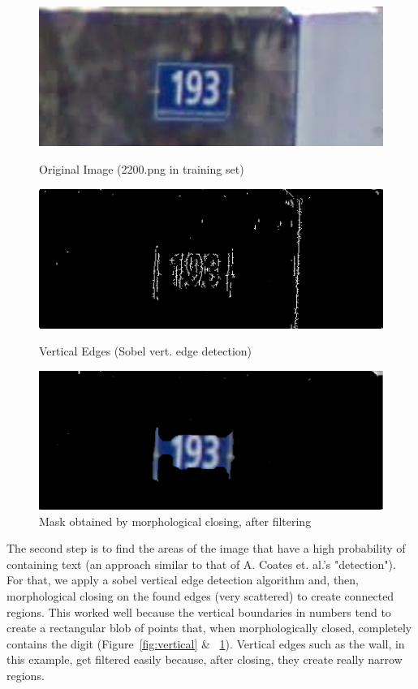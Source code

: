 \documentclass{article} %
\begin{document}
\begin{figure}[!htb]
  \includegraphics[width=\linewidth]{images/image02}
  \caption{Original Image (2200.png in training set)}
  \label{fig:orig}
\endminipage\hfill
{}
  \includegraphics[width=\linewidth]{images/image06}
  \caption{Vertical Edges (Sobel vert. edge detection)}
  \label{fig:vertical}
\endminipage\hfill
{}%
  \includegraphics[width=\linewidth]{images/image00}
  \caption{Mask obtained by morphological closing, after filtering}
  \label{fig:mask}
\endminipage
\end{figure}

The second step is to find the areas of the image that have a high probability of containing text (an approach similar to that of A. Coates et. al.'s "detection"\cite{coates2011text}). For that, we apply a sobel vertical edge detection algorithm and, then, morphological closing on the found edges (very scattered) to create connected regions. This worked well because the vertical boundaries in numbers tend to create a rectangular blob of points that, when morphologically closed, completely contains the digit (Figure~\ref{fig:vertical} \& ~\ref{fig:mask}). Vertical edges such as the wall, in this example, get filtered easily because, after closing, they create really narrow regions.
\end{document}
